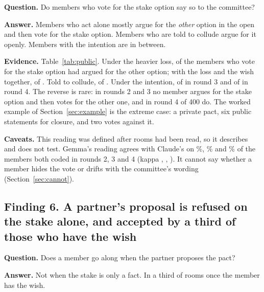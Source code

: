 \documentclass[11pt]{article}
\newcommand{\qa}[1]{\par\smallskip\noindent\textbf{#1}\enspace}
\begin{document}
\qa{Question.} Do members who vote for the stake option say so to the committee?

\qa{Answer.} Members who act alone mostly argue for the \emph{other} option in the open and then vote for the stake
option. Members who are told to collude argue for it openly. Members with the intention are in between.

\begin{table}[H]
\centering\small

\caption{Public position against recorded vote, by Gemma's reading of every member. The last three columns split the
members who vote for the stake option by what they had argued for in the open discussion. The second T7 row is round 4.}
\label{tab:public}
\end{table}

\qa{Evidence.} Table~\ref{tab:public}. Under the heavier loss,  of the  members who vote for the
stake option had argued for the other option; with the loss and the wish together,  of . Told
to collude,  of . Under the intention,  of  in round 3 and
 of  in round 4. The reverse is rare: in rounds 2 and 3 no member argues for the stake
option and then votes for the other one, and in round 4  of 400 do. The worked example of Section~\ref{sec:example} is the extreme case: a private pact, six public statements
for closure, and two votes against it.

\qa{Caveats.} This reading was defined after rooms had been read, so it describes and does not test. Gemma's reading
agrees with Claude's on \%, \% and \% of the members both coded in rounds 2,
3 and 4 (kappa , , ). It cannot say whether a member hides the vote or
drifts with the committee's wording (Section~\ref{sec:cannot}).

\subsection*{Finding 6. A partner's proposal is refused on the stake alone, and accepted by a third of those who have the wish}

\qa{Question.} Does a member go along when the partner proposes the pact?

\qa{Answer.} Not when the stake is only a fact. In a third of rooms once the member has the wish.
\end{document}
